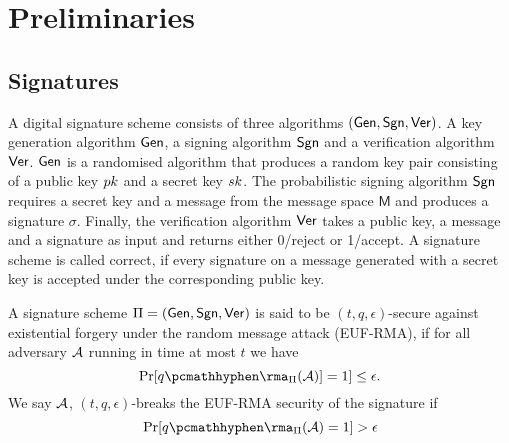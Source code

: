 \section{Preliminaries}\label{sec:preliminaries}








\subsection{Signatures}

A digital signature scheme consists of three algorithms $(\mathsf{Gen}, \mathsf{Sgn}, \mathsf{Ver})$. A key generation algorithm $\mathsf{Gen}$, a signing algorithm $\mathsf{Sgn}$ and a verification algorithm $\mathsf{Ver}$. $\mathsf{Gen}$ is a randomised algorithm that produces a random key pair consisting of a public key $pk$ and a secret key $sk$. The probabilistic signing algorithm $\mathsf{Sgn}$ requires a secret key and a message from the message space $\mathsf{M}$ and produces a signature $\sigma$. Finally, the verification algorithm $\mathsf{Ver}$ takes a public key, a message and a signature as input and returns either 0/reject or 1/accept. A signature scheme is called correct, if every signature on a message generated with a secret key is accepted under the corresponding public key.

\begin{definition}
A signature scheme $\Pi = (\mathsf{Gen}, \mathsf{Sgn}, \mathsf{Ver})$ is said to be $(t,q,\epsilon)$-secure against existential forgery under the random message attack (EUF-RMA), if for all adversary $\mathcal{A}$ running in time at most $t$ we have
$$\Pr[q\hyph\rma_{\Pi}(\adv)]=1] \leq \epsilon.$$
We say $\mathcal{A}$, $(t,q,\epsilon)$-breaks the EUF-RMA security of the signature if
$$\Pr[q\hyph\rma_{\Pi}(\adv)=1] > \epsilon$$
\end{definition}



